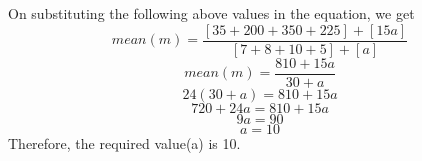 \documentclass[12pt, a4paper, twocolumn]{article}
\begin{document}
On substituting the following above values in the equation, we get
\begin{equation*}
	mean(m) = \frac{[35 + 200 + 350 + 225] + [15a]}{[7 + 8 + 10 + 5] + [a]}
\end{equation*}
\begin{equation*}
	mean(m) = \frac{810 + 15a}{30 + a}
\end{equation*}
	\begin{equation*}
		24(30 + a) = 810 + 15a
	\end{equation*}
	\begin{equation*}
		720 + 24a = 810 + 15a
	\end{equation*}
	\begin{equation*}
		9a = 90
	\end{equation*}
	\begin{equation*}
		a = 10
	\end{equation*}
	Therefore, the required value(a) is 10.
\end{document}
